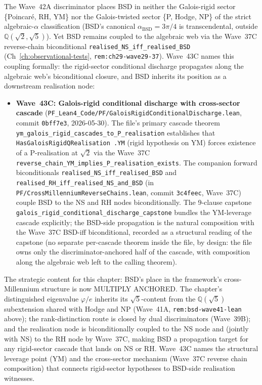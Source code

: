 \begin{remark}\label{rem:bsd-wave43c-lean}
The Wave~42A discriminator places BSD in neither the Galois-rigid sector \{Poincar\'e, RH, YM\} nor the Galois-twisted sector \{P, Hodge, NP\} of the strict algebraic-$\alpha$ classification (BSD's canonical $\alpha_{\mathrm{BSD}} = 3\pi/4$ is transcendental, outside $\mathbb{Q}(\sqrt{2}, \sqrt{5})$). Yet BSD remains coupled to the algebraic web via the Wave~37C reverse-chain biconditional \texttt{realised\_NS\_iff\_realised\_BSD} (Ch~\ref{ch:observational-tests}, \texttt{rem:ch29-wave29-37}). Wave~43C names this coupling formally: the rigid-sector conditional discharge propagates along the algebraic web's biconditional closure, and BSD inherits its position as a downstream realisation node:
\begin{itemize}
  \item \textbf{Wave~43C: Galois-rigid conditional discharge with cross-sector cascade} (\texttt{PF\_Lean4\_Code/PF/GaloisRigidConditionalDischarge.lean}, commit \texttt{0bff7e3}, 2026-05-30). The file's primary cascade theorem \texttt{ym\_galois\_rigid\_cascades\_to\_P\_realisation} establishes that \texttt{HasGaloisRigidQRealisation .YM} (rigid hypothesis on YM) forces existence of a P-realisation at $\sqrt{2}$ via the Wave~37C \texttt{reverse\_chain\_YM\_implies\_P\_realisation\_exists}. The companion forward biconditionals \texttt{realised\_NS\_iff\_realised\_BSD} and \texttt{realised\_RH\_iff\_realised\_NS\_and\_BSD} (in \texttt{PF/CrossMillenniumReverseChains.lean}, commit \texttt{3c4feec}, Wave~37C) couple BSD to the NS and RH nodes biconditionally. The 9-clause capstone \texttt{galois\_rigid\_conditional\_discharge\_capstone} bundles the YM-leverage cascade explicitly; the BSD-side propagation is the natural composition with the Wave~37C BSD-iff biconditional, recorded as a structural reading of the capstone (no separate per-cascade theorem inside the file, by design: the file owns only the discriminator-anchored half of the cascade, with composition along the algebraic web left to the calling theorem).
\end{itemize}
The strategic content for this chapter: BSD's place in the framework's cross-Millennium structure is now MULTIPLY ANCHORED. The chapter's distinguished eigenvalue $\varphi/e$ inherits its $\sqrt{5}$-content from the $\mathbb{Q}(\sqrt{5})$ subextension shared with Hodge and NP (Wave~41A, \texttt{rem:bsd-wave41-lean} above); the rank-distinction route is closed by dual discriminators (Wave~39B); and the realisation node is biconditionally coupled to the NS node and (jointly with NS) to the RH node by Wave~37C, making BSD a propagation target for any rigid-sector cascade that lands on NS or RH. Wave~43C names the structural leverage point (YM) and the cross-sector mechanism (Wave~37C reverse chain composition) that connects rigid-sector hypotheses to BSD-side realisation witnesses.


\end{remark}
